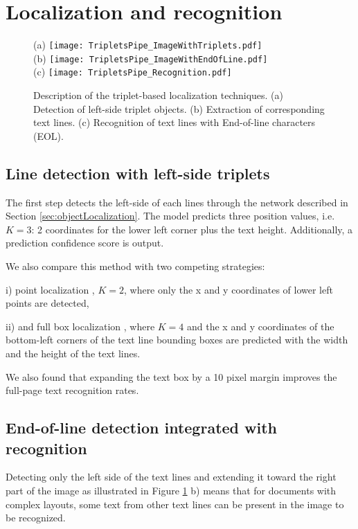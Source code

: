 \documentclass[conference]{IEEEtran}
\begin{document}
\section{Localization and recognition}

\begin{figure}[!t]
  \centering
  \small{(a)} \texttt{[image: TripletsPipe\_ImageWithTriplets.pdf]} \\
  \small{(b)} \texttt{[image: TripletsPipe\_ImageWithEndOfLine.pdf]} \\
  \small{(c)} \texttt{[image: TripletsPipe\_Recognition.pdf]}
  \caption{Description of the triplet-based localization techniques. (a) Detection of left-side triplet objects. (b) Extraction of corresponding text lines. (c) Recognition of text lines with End-of-line characters (EOL).}
  \label{fig:triplets}
\end{figure}

\subsection{Line detection with left-side triplets}
\label{sec:triplets}
The first step detects the left-side of each lines through the network described in Section \ref{sec:objectLocalization}. The model predicts three position values, i.e. $K{=}3$: 2 coordinates for the lower left corner plus the text height. Additionally, a prediction confidence score is output.

We also compare this method with two competing strategies:

i) point localization \cite{moysset2016points}, $K{=}2$, where only the x and y coordinates of lower left points are detected,

ii) and full box localization \cite{moysset2016learning}, where $K{=}4$ and the x and y coordinates of the bottom-left corners of the text line bounding boxes are predicted with the width and the height of the text lines.

We also found that expanding the text box by a 10 pixel margin
improves the full-page text recognition rates.


\subsection{End-of-line detection integrated with recognition}
\label{sec:recognizer}
Detecting only the left side of the text lines and extending it toward the right part of the image as illustrated in Figure \ref{fig:triplets} b) means that for documents with complex layouts, some text from other text lines can be present in the image to be recognized.
\end{document}
